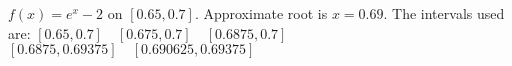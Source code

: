 {$f(x) = e^x - 2$ on $[0.65,0.7]$.
}
{Approximate root is $x=0.69$. The intervals used are:
$[0.65,0.7] \quad [0.675,0.7] \quad [0.6875,0.7]$
$[0.6875,0.69375]\quad [0.690625,0.69375]$
}
